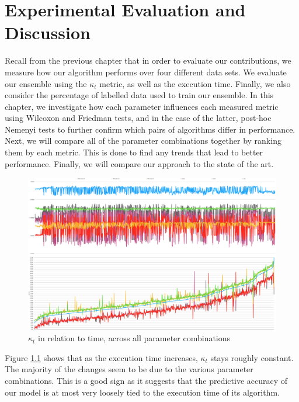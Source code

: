 
\chapter{Experimental Evaluation and Discussion\label{chapter:evaluation_discussion}} %

Recall from the previous chapter that in order to evaluate our contributions, we measure how our algorithm performs over four different data sets. We evaluate our ensemble using the $\kappa_t$ metric, as well as the execution time. Finally, we also consider the percentage of labelled data used to train our ensemble.
In this chapter, we investigate how each parameter influences each measured metric using Wilcoxon and Friedman tests, and in the case of the latter, post-hoc Nemenyi tests to further confirm which pairs of algorithms differ in performance. Next, we will compare all of the parameter combinations together by ranking them by each metric. This is done to find any trends that lead to better performance. Finally, we will compare our approach to the state of the art.

\newpage

\begin{figure}
  \includegraphics[width=\linewidth]{./images/chapter5/kappa_vs_time}
\caption{\label{fig:kappa_vs_time}$\kappa_t$ in relation to time, across all parameter combinations}
\end{figure}
Figure \ref{fig:kappa_vs_time} shows that as the execution time increases, $\kappa_t$ stays roughly constant. The majority of the changes seem to be due to the various parameter combinations. This is a good sign as it suggests that the predictive accuracy of our model is at most very loosely tied to the execution time of its algorithm.

